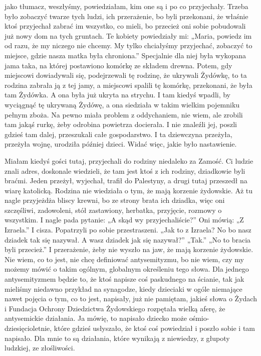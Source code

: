 {jako tłumacz, weszłyśmy, powiedziałam, kim one są i po co przyjechały. Trzeba było zobaczyć twarze tych ludzi, ich przerażenie, bo byli przekonani, że właśnie ktoś przyjechał zabrać im wszystko, co mieli, bo przecież oni sobie pobudowali już nowy dom na tych gruntach. Te kobiety powiedziały mi: „Maria, powiedz im od razu, że my niczego nie chcemy. My tylko chciałyśmy przyjechać, zobaczyć to miejsce, gdzie nasza matka była chroniona.” Specjalnie dla niej była wykopana jama taka, na której postawiono komórkę ze składem drewna. Potem, gdy miejscowi dowiadywali się, podejrzewali tę rodzinę, że ukrywali Żydówkę, to ta rodzina zabrała ją z tej jamy, a miejscowi spalili tę komórkę, przekonani, że była tam Żydówka. A ona była już ukryta na strychu. I tam kiedyś wpadli, by wyciągnąć tę ukrywaną Żydówę, a ona siedziała w takim wielkim pojemniku pełnym zboża. Na pewno miała problem z oddychaniem, nie wiem, ale zrobili tam jakąś rurkę, żeby odrobina powietrza docierała. I nie znaleźli jej, poszli gdzieś tam dalej, przeszukali całe gospodarstwo. I ta dziewczyna przeżyła, przeżyła wojnę, urodziła później dzieci. Widać więc, jakie było nastawienie.  

Miałam kiedyś gości tutaj, przyjechali do rodziny niedaleko za Zamość. Ci ludzie znali adres, doskonale wiedzieli, że tam jest ktoś z ich rodziny, dziadkowie byli braćmi. Jeden przeżył, wyjechał, trafił do Palestyny, a drugi tutaj przeszedł na wiarę katolicką. Rodzina nie wiedziała o tym, że mają korzenie żydowskie. Aż tu nagle przyjeżdża bliscy krewni, bo ze strony brata ich dziadka, więc oni szczęśliwi, zadowoleni, stół zastawiony, herbatka, przyjęcie, rozmowy o wszystkim. I nagle pada pytanie: „A skąd wy przyjechaliście?” Oni mówią: „Z Izraela.” I cisza. Popatrzyli po sobie przestraszeni. „Jak to z Izraela? No bo nasz dziadek tak się nazywał. A wasz dziadek jak się nazywał?” „Tak.” „No to bracia byli przecież.” I przerażenie, żeby nie wyszło na jaw, że mają korzenie żydowskie. Nie wiem, co to jest, nie chcę definiować antysemityzmu, bo nie wiem, czy my możemy mówić o takim ogólnym, globalnym określeniu tego słowa. Dla jednego antysemityzmem będzie to, że ktoś napisze coś paskudnego na ścianie, tak jak mieliśmy niedawno przykład na synagodze, kiedy dzieciaki w ogóle niemające nawet pojęcia o tym, co to jest, napisały, już nie pamiętam, jakieś słowa o Żydach i Fundacja Ochrony Dziedzictwa Żydowskiego rozpętała wielką aferę, że antysemickie działania. Ja mówię, to napisało dziecko może ośmio- dziesięcioletnie, które gdzieś usłyszało, że ktoś coś powiedział i poszło sobie i tam napisało. Dla mnie to są działania, które wynikają z niewiedzy, z głupoty ludzkiej, ze złośliwości. 

}
